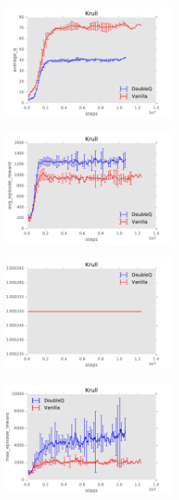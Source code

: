 \documentclass{sig-alternate}
\begin{document}
\begin{figure}[h!]
    \centering
    \includegraphics[width=0.5\textwidth]{../results/Krull/Comparisons/DoubleQ/DoubleQ-baseline-average_q.pdf}
\end{figure}

\begin{figure}[h!]
    \centering
    \includegraphics[width=0.5\textwidth]{../results/Krull/Comparisons/DoubleQ/DoubleQ-baseline-avg_episode_reward.pdf}
\end{figure}

\begin{figure}[h!]
    \centering
    \includegraphics[width=0.5\textwidth]{../results/Krull/Comparisons/DoubleQ/DoubleQ-baseline-learning_rate.pdf}
\end{figure}


\begin{figure}[h!]
    \centering
    \includegraphics[width=0.5\textwidth]{../results/Krull/Comparisons/DoubleQ/DoubleQ-baseline-max_episode_reward.pdf}
\end{figure}
\end{document}
